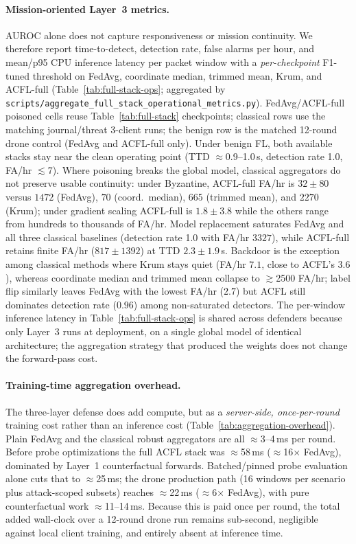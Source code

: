 \paragraph{Mission-oriented Layer~3 metrics.}
AUROC alone does not capture responsiveness or mission continuity.
We therefore report time-to-detect, detection rate, false alarms per hour, and mean/p95 CPU inference latency per packet window with a \emph{per-checkpoint} F1-tuned threshold on FedAvg, coordinate median, trimmed mean, Krum, and ACFL-full (Table~\ref{tab:full-stack-ops}; aggregated by \texttt{scripts/aggregate\_full\_stack\_operational\_metrics.py}).
FedAvg/ACFL-full poisoned cells reuse Table~\ref{tab:full-stack} checkpoints; classical rows use the matching journal/threat 3-client runs; the benign row is the matched 12-round drone control (FedAvg and ACFL-full only).
Under benign FL, both available stacks stay near the clean operating point (TTD $\approx$0.9--1.0\,s, detection rate 1.0, FA/hr $\lesssim$7).
Where poisoning breaks the global model, classical aggregators do not preserve usable continuity: under Byzantine, ACFL-full FA/hr is \textbf{$32 \pm 80$} versus $1472$ (FedAvg), $70$ (coord.\ median), $665$ (trimmed mean), and $2270$ (Krum); under gradient scaling ACFL-full is \textbf{$1.8 \pm 3.8$} while the others range from hundreds to thousands of FA/hr.
Model replacement saturates FedAvg and all three classical baselines (detection rate 1.0 with FA/hr $3327$), while ACFL-full retains finite FA/hr ($817 \pm 1392$) at TTD $2.3 \pm 1.9$\,s.
Backdoor is the exception among classical methods where Krum stays quiet (FA/hr $7.1$, close to ACFL's \textbf{$3.6$}), whereas coordinate median and trimmed mean collapse to $\gtrsim$2500 FA/hr; label flip similarly leaves FedAvg with the lowest FA/hr ($2.7$) but ACFL still dominates detection rate ($0.96$) among non-saturated detectors.
The per-window inference latency in Table~\ref{tab:full-stack-ops} is shared across defenders because only Layer~3 runs at deployment, on a single global model of identical architecture; the aggregation strategy that produced the weights does not change the forward-pass cost.

\paragraph{Training-time aggregation overhead.}
The three-layer defense does add compute, but as a \emph{server-side, once-per-round} training cost rather than an inference cost (Table~\ref{tab:aggregation-overhead}).
Plain FedAvg and the classical robust aggregators are all $\approx$3--4\,ms per round.
Before probe optimizations the full ACFL stack was $\approx$58\,ms ($\approx$16$\times$ FedAvg), dominated by Layer~1 counterfactual forwards.
Batched/pinned probe evaluation alone cuts that to $\approx$25\,ms; the drone production path (16 windows per scenario plus attack-scoped subsets) reaches $\approx$22\,ms ($\approx$6$\times$ FedAvg), with pure counterfactual work $\approx$11--14\,ms.
Because this is paid once per round, the total added wall-clock over a 12-round drone run remains sub-second, negligible against local client training, and entirely absent at inference time.

